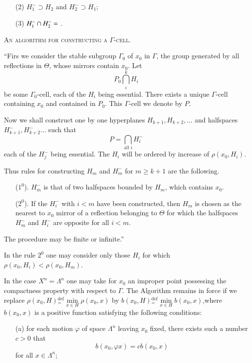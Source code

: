 \begin{description}
\begin{itemize}
\item[(2)] $H^-_1 \supset H_2$ and $H^-_2 \supset H_1$;

\item[(3)] $H^-_1 \cap H^-_2 = \empty$ .
\end{itemize}

\medskip
\noindent
\textsc{An algorithm for constructing a $\Gamma$-cell.}

``Firs we consider the stable subgroup $\Gamma_0$ of $x_0$ in $\Gamma$, \ie the group generated by all reflections in $\Theta$, whose mirrors contain $x_0$. Let 
$$
P_0 \bigcap\limits^k_{i} H_i
$$
be some $\Gamma_0$-cell, each of the $H_i$ being essential. There exists a unique $\Gamma$-cell containing $x_0$ and contained in $P_0$. This $\Gamma$-cell we denote by $P$.

Now we shall construct one by one hyperplanes $H_{k+1}, H_{k+2}, \ldots$ and halfspaces $H^-_{k+1}, H^-_{k+2} \ldots$ such that 
$$
P = \bigcap\limits_{\text{all } i} H^-_i
$$
each of the $H^-_j$ being essential. The $H_i$ will be ordered by increase of $\rho (x_0, H_i)$.

Thus rules for constructing $H_m$ and $H^-_m$ for $m\geqslant k +1$ are the following.
\begin{itemize}
\item[($1^0$).] $H^-_m$ is that of two halfspaces bounded by $H_m$, which contains $x_0$.

\item[($2^0$).] If the $H^-_i$ with $i < m$ have been constructed, then $H_m$ is chosen as the nearest to $x_0$ mirror of a reflection belonging to $\Theta$ for which the halfspaces $H^-_m$ and $H^-_i$ are opposite for all $i < m$.
\end{itemize}

The procedure may be finite or infinite.''

In the rule $2^0$ one may consider only those $H_i$ for which $\rho(x_0, H_i) < \rho (x_0 , H_m)$.

In the case $X^n = \Lambda^n$ one may take for $x_0$ an improper point possessing the compactness property with respect to $\Gamma$. The Algorithm remains in force if we replace $\rho (x_0, H) {}^{\text{def}}_= \min\limits_{x \in H} \rho (x_0, x) $ by $b(x_0, H) {}^{\text{def}}_= \min\limits_{x \in H} b(x_0 ,x)$,\pageoriginale where $b(x_0, x)$ is a positive function satisfying the following conditions:
\begin{itemize}
\item[(a)] for each motion $\varphi$ of space $\Lambda^n$ leaving $x_0$ fixed, there exists such a number $c > 0$ that
$$
b (x_0 , \varphi x) = c b( x_0 , x)
$$
for all $x \in \Lambda^n$;


\end{itemize}
\end{description}

